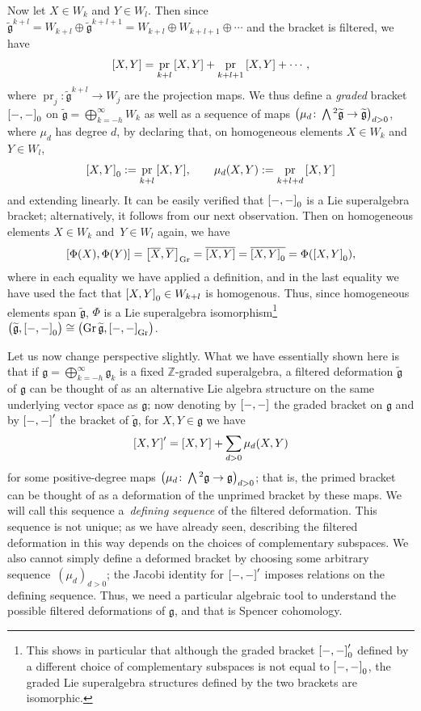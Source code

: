 \documentclass[11pt]{article}
\numberwithin{equation}{section}
\numberwithin{equation}{section}
\newcommand{\fg}{\mathfrak{g}}
\newcommand{\ZZ}{\mathbb{Z}}
\newcommand{\fgtilde}{\widetilde{\mathfrak{g}}}
\newcommand{\Wedge}{\mathchoice{{\textstyle\bigwedge}}{\bigwedge}{\bigwedge}{\bigwedge}}	%
\newcommand{\1}{\mathbbm{1}}
\DeclareMathOperator{\Gr}{Gr}
\DeclareMathOperator{\pr}{pr}
\begin{document}
Now let $X\in W_k$ and $Y\in W_l$. Then since $\fgtilde^{k+l} = W_{k+l}\oplus\fgtilde^{k+l+1} = W_{k+l}\oplus W_{k+l+1}\oplus\cdots$ and the bracket is filtered, we have
\[
	\comm{X}{Y} = \pr_{k+l}\comm{X}{Y} + \pr_{k+l+1}\comm{X}{Y} + \cdots,
\]
where $\pr_j\colon\fgtilde^{k+l}\to W_j$ are the projection maps. We thus define a \emph{graded} bracket $\comm{-}{-}_0$ on $\fgtilde=\bigoplus_{k=-h}^\infty W_k$ as well as a sequence of maps $\bigl(\mu_d\colon\Wedge^2\fgtilde\to\fgtilde\bigr)_{d> 0}$, where $\mu_d$ has degree $d$, by declaring that, on homogeneous elements $X\in W_k$ and $Y\in W_l$,
\[
	\comm{X}{Y}_0 := \pr_{k+l}\comm{X}{Y},	\qquad \mu_d(X,Y) := \pr_{k+l+d}\comm{X}{Y}
\]
and extending linearly. It can be easily verified that $\comm{-}{-}_0$ is a Lie superalgebra bracket; alternatively, it follows from our next observation. Then on homogeneous elements $X\in W_k$ and~${Y\in W_l}$ again, we have
\[
	\comm{\Phi(X)}{\Phi(Y)} = \comm{\overline{X}}{\overline{Y}}_{\mathrm{Gr}} = \overline{\comm{X}{Y}} = \overline{\comm{X}{Y}_0} = \Phi(\comm{X}{Y}_0),
\]
where in each equality we have applied a definition, and in the last equality we have used the fact that $\comm{X}{Y}_0\in W_{k+l}$ is homogenous. Thus, since homogeneous elements span $\fgtilde$, $\Phi$ is a Lie superalgebra isomorphism\footnote{This shows in particular that although the graded bracket $\comm{-}{-}'_0$ defined by a different choice of complementary subspaces is not equal to $\comm{-}{-}_0$, the graded Lie superalgebra structures defined by the two brackets are isomorphic.}
$\bigl(\fgtilde,\comm{-}{-}_0\bigr)\cong \bigl(\Gr\fgtilde,\comm{-}{-}_{\mathrm{Gr}}\bigr)$.

Let us now change perspective slightly. What we have essentially shown here is that if $\fg=\bigoplus_{k=-h}^\infty\fg_k$ is a fixed $\ZZ$-graded superalgebra, a filtered deformation $\fgtilde$ of $\fg$ can be thought of as an alternative Lie algebra structure on the same underlying vector space as $\fg$; now denoting by $\comm{-}{-}$ the graded bracket on $\fg$ and by $\comm{-}{-}'$ the bracket of $\fgtilde$, for $X,Y\in\fg$ we have
\begin{equation}\label{eq:defining-sequence}
	\comm{X}{Y}' = \comm{X}{Y} + \sum_{d>0}\mu_d(X,Y)
\end{equation}
for some positive-degree maps $\bigl(\mu_d\colon\Wedge^2\fg\to\fg\bigr)_{d> 0}$; that is, the primed bracket can be thought of as a deformation of the unprimed bracket by these maps. We will call this sequence a~\emph{defining sequence} of the filtered deformation. This sequence is not unique; as we have already seen, describing the filtered deformation in this way depends on the choices of complementary subspaces. We also cannot simply define a deformed bracket by choosing some arbitrary sequence~$(\mu_d)_{d>0}$; the Jacobi identity for $\comm{-}{-}'$ imposes relations on the defining sequence. Thus, we need a particular algebraic tool to understand the possible filtered deformations of $\fg$, and that is Spencer cohomology.
\end{document}
